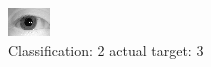 \begin{figure}[h!]
\begin{center}
\includegraphics[width=0.60\columnwidth]{figures/ID1171_class_2_target_3.png}
\end{center}
\caption{ Classification: 2 actual target: 3}
\label{fig:ID1171_class_2_target_3}
\end{figure}

